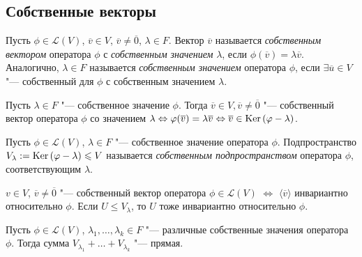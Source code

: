 \subsection{Собственные векторы}

\begin{definition}
	Пусть $\phi \in \mathcal{L}(V)$, $\overline{v} \in V$, $\overline{v} \ne \overline{0}$, $\lambda \in F$. Вектор $\overline{v}$ называется \textit{собственным вектором} оператора $\phi$ с \textit{собственным значением} $\lambda$, если $\phi(\overline{v}) = \lambda\overline{v}$. Аналогично, $\lambda \in F$ называется \textit{собственным значением} оператора $\phi$, если $\exists \overline{u} \in V$ "--- собственный для $\phi$ с собственным значением $\lambda$.
\end{definition}

\begin{note}
	Пусть $\lambda \in F$ "--- собственное значение $\phi$. Тогда $\overline{v} \in V, \overline{v} \ne \overline{0}$ "--- собственный вектор оператора $\phi$ со значением $\lambda \hm{\Leftrightarrow} \phi(\overline{v}) = \lambda\overline{v} \hm{\Leftrightarrow} \overline{v} \hm{\in} \ke{(\phi - \lambda)}$.
\end{note}

\begin{definition}
	Пусть $\phi \in \mathcal{L}(V)$, $\lambda \in F$ "--- собственное значение оператора $\phi$. Подпространство $V_\lambda := \operatorname{Ker}{(\varphi - \lambda)} \leqslant V$ называется \textit{собственным подпространством} оператора $\phi$, соответствующим $\lambda$.
\end{definition}

\begin{note}
	$v \in V$, $\overline{v} \ne \overline{0}$ "--- собственный вектор оператора $\phi \in \mathcal{L}(V)$ $\Leftrightarrow$ $\langle \overline{v} \rangle$ инвариантно относительно $\phi$. Если $U \le V_\lambda$, то $U$ тоже инвариантно относительно $\phi$.
\end{note}

\begin{theorem}
	Пусть $\phi \in \mathcal{L}(V)$, $\lambda_1, \dots, \lambda_k \in F$ "--- различные собственные значения оператора $\phi$. Тогда сумма $V_{\lambda_1} + \dots + V_{\lambda_k}$ "--- прямая.
\end{theorem}


